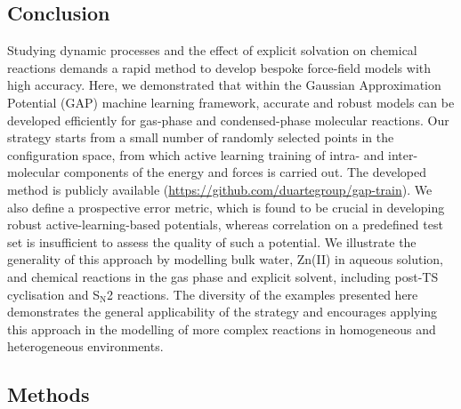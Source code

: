 \documentclass[../../main.tex]{subfiles}
\begin{document}
\subsection{Conclusion}

Studying dynamic processes and the effect of explicit solvation on chemical reactions demands a rapid method to develop bespoke force-field models with high accuracy. Here, we demonstrated that within the Gaussian Approximation Potential (GAP) machine learning framework, accurate and robust models can be developed efficiently for gas-phase and condensed-phase molecular reactions. Our strategy starts from a small number of randomly selected points in the configuration space, from which active learning training of intra- and inter-molecular components of the energy and forces is carried out. The developed method is publicly available (\url{https://github.com/duartegroup/gap-train}). We also define a prospective error metric, which is found to be crucial in developing robust active-learning-based potentials, whereas correlation on a predefined test set is insufficient to assess the quality of such a potential. We illustrate the generality of this approach by modelling bulk water, Zn(II) in aqueous solution, and chemical reactions in the gas phase and explicit solvent, including post-TS cyclisation and S${}_\text{N}$2 reactions. The diversity of the examples presented here demonstrates the general applicability of the strategy and encourages applying this approach in the modelling of more complex reactions in homogeneous and heterogeneous environments.



\subsection{Methods}
\end{document}
